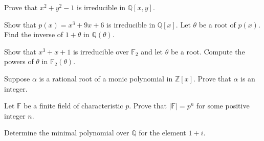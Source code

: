\documentclass[12pt,letterpaper]{hmcpset}
\newcommand{\Ff}{\mathbb{F}}
\newcommand{\Zz}{\mathbb{Z}}
\newcommand{\Qq}{\mathbb{Q}}
\begin{document}
\begin{problem}
	Prove that $x^2 + y^2 - 1$ is irreducible in $\Qq[x,y].$
\end{problem}

\begin{problem}
	Show that $p(x)=x^3 + 9x + 6$ is irreducible in $\Qq[x]$. Let $\theta$ be a root of $p(x)$. Find the inverse of $1+\theta$ in $\Qq(\theta).$
\end{problem}

\begin{problem}[13.1.3]
	Show that $x^3+x+1$ is irreducible over $\Ff_2$ and let $\theta$ be a root. Compute the powers of $\theta$ in $\Ff_2(\theta)$.
\end{problem}
\begin{solution}
	\vfill
\end{solution}
\newpage

\begin{problem}
	Suppose $\alpha$ is a rational root of a monic polynomial in $\Zz[x]$. Prove that $\alpha$ is an integer.
\end{problem}

\begin{problem}
	Let $\Ff$ be a finite field of characteristic $p$. Prove that $|\Ff| = p^n$ for some positive integer $n$.
\end{problem}

\begin{problem}[13.2.3]
	Determine the minimal polynomial over $\Qq$ for the element $1+i.$
\end{problem}
\begin{solution}
	\vfill
\end{solution}
\newpage
\end{document}
